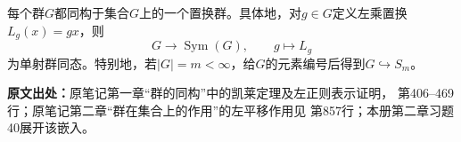 \begin{reviewtheorem}[凯莱定理与有限群的正则嵌入]\label{tool:a-cayley}
每个群$G$都同构于集合$G$上的一个置换群。具体地，对$g\in G$定义左乘置换$L_g(x)=gx$，则
\[
G\longrightarrow\operatorname{Sym}(G),\qquad g\longmapsto L_g
\]
为单射群同态。特别地，若$|G|=m<\infty$，给$G$的元素编号后得到$G\hookrightarrow S_m$。

\textbf{原文出处：}原笔记第一章“群的同构”中的凯莱定理及左正则表示证明， 第406--469行；原笔记第二章“群在集合上的作用”的左平移作用见 第857行；本册第二章习题40展开该嵌入。
\end{reviewtheorem}
